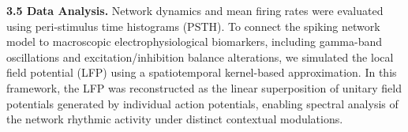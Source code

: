 \textbf{3.5 Data Analysis.} Network dynamics and mean firing rates were evaluated using peri-stimulus time histograms (PSTH). To connect the spiking network model to macroscopic electrophysiological biomarkers, including gamma-band oscillations and excitation/inhibition balance alterations, we simulated the local field potential (LFP) using a spatiotemporal kernel-based approximation. In this framework, the LFP was reconstructed as the linear superposition of unitary field potentials generated by individual action potentials, enabling spectral analysis of the network rhythmic activity under distinct contextual modulations.
